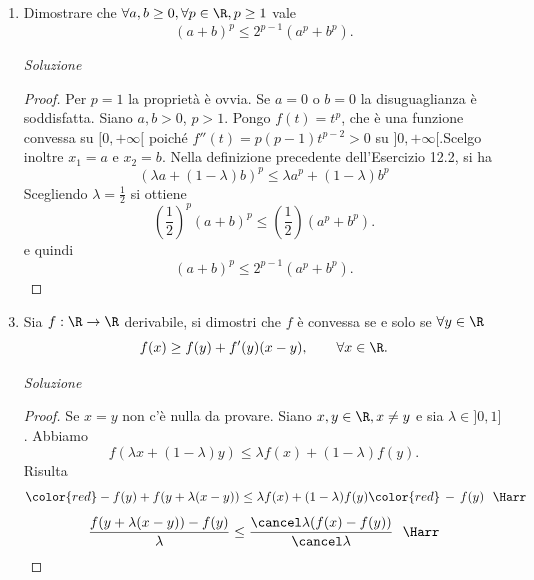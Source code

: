 \documentclass{article}
\begin{document}
\begin{enumerate}[label=\textbf{Esercizio 12.\arabic*.},itemindent=*]
\begin{proof}
    \[f(\lambda x_1+(1-\lambda)x_2)<\lambda f(x_1)+(1-\lambda)f(x_2)~~~~~\forall \lambda \in ]0,1[\quad \forall x_1,x_2\in \R, x_1\neq x_2. \]
    Osserviamo che 
    \[(\lambda x_1+(1-\lambda)x_2)^2<\lambda x_1^2+(1-\lambda)x^2_2~~\Harr\]
    \[x_1^2\lambda(\lambda-1)+x_2^2((1-\lambda)^2-(1-\lambda))+2\lambda(1-\lambda)x_1x_2<0~~\Harr\]
    \[\lambda(\lambda-1)[x_1^2+x_2^2-2x_1x_2]<0\]
    \[\lambda(\lambda-1)(x_1-x_2)^2 < 0\]
    che è verificato $\forall \lambda \in ]0,1[, \forall x_1,x_2\in \R, x\neq x_1$.
\end{proof}
\item Dimostrare che $\forall a,b\geq 0, \forall p\in\R, p\geq 1$ vale
\[(a+b)^p\leq 2^{p-1}(a^p+b^p).\]
\item[\textit{\large Soluzione~}]~
\begin{proof} 
    Per $p=1$ la proprietà è ovvia. Se $a=0$ o $b=0$ la disuguaglianza è soddisfatta. Siano $a,b>0$, $p>1$. Pongo $f(t)=t^p$, che è una funzione convessa su $[0,+\infty[$ poiché $f''(t)=p(p-1)t^{p-2}>0$ su $]0,+\infty[$.Scelgo inoltre $x_1=a$ e $x_2=b$. Nella definizione precedente dell'Esercizio 12.2, si ha 
    \[(\lambda a +(1-\lambda)b)^p\leq \lambda a^p+(1-\lambda)b^p\]
    Scegliendo $\lambda=\frac{1}{2}$ si ottiene
    \[\left( \frac{1}{2} \right)^p(a+b)^p\leq \left( \frac{1}{2} \right)(a^p+b^p).\]
    e quindi
    \[(a+b)^p\leq 2^{p-1}(a^p+b^p).\]
\end{proof}
\item Sia $f:\R\to\R$ derivabile, si dimostri che $f$ è convessa se e solo se $\forall y \in \R$ \[f(x)\geq f(y)+f'(y)(x-y),\qquad \forall x \in \R .\]
\item[\textit{\large Soluzione~}]~
\begin{proof}
    Se $x=y$ non c'è nulla da provare. Siano $x,y\in \R, x\neq y$ e sia $\lambda\in ]0,1]$. Abbiamo 
    \[f(\lambda x +(1 -\lambda )y)\leq \lambda f(x) + (1 -\lambda)f(y).\]
    Risulta
    \[ {\color{red}- f(y)} + f(y +\lambda(x - y))\leq \lambda f(x) +(1 -\lambda)f(y){\color{red}\, -\, f(y)}~ ~ \Harr\]
    \[\frac{f(y +\lambda(x - y))- f(y)}{\lambda} \leq \frac{\cancel\lambda (f(x) - f(y))}{\cancel\lambda}~ ~ \Harr\]

\end{proof}
\end{enumerate}
\end{document}

